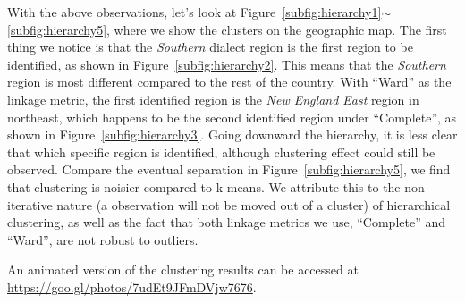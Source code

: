 \qquad  With the above observations, let's look at Figure~\ref{subfig:hierarchy1}$\sim$\ref{subfig:hierarchy5}, where we show the clusters on the geographic map. The first thing we notice is that the {\em Southern} dialect region is the first region to be identified, as shown in Figure~\ref{subfig:hierarchy2}. This means that the {\em Southern} region is most different compared to the rest of the country. With ``Ward'' as the linkage metric, the first identified region is the {\em New England East} region in northeast, which happens to be the second identified region under ``Complete'', as shown in Figure~\ref{subfig:hierarchy3}. Going downward the hierarchy, it is less clear that which specific region is identified, although clustering effect could still be observed. Compare the eventual separation in Figure~\ref{subfig:hierarchy5}, we find that clustering is noisier compared to k-means. We attribute this to the non-iterative nature (a observation will not be moved out of a cluster) of hierarchical clustering, as well as the fact that both linkage metrics we use, ``Complete'' and ``Ward'', are not robust to outliers.

\qquad  An animated version of the clustering results can be accessed at \url{https://goo.gl/photos/7udEt9JFmDVjw7676}.
